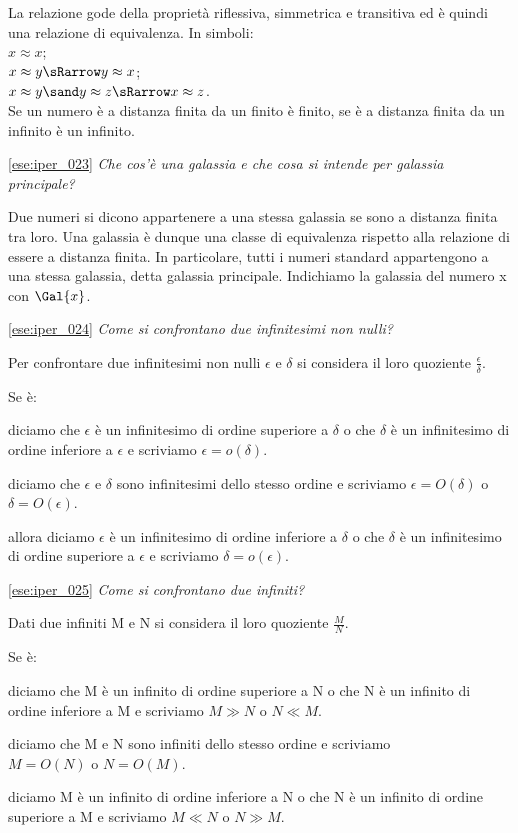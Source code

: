La relazione gode della proprietà riflessiva, simmetrica e transitiva ed è 
quindi una relazione di equivalenza. In simboli:\\
\(x \approx x\);\\
\(x \approx y \sRarrow y \approx x\);\\
\(x \approx y \sand y \approx z \sRarrow x \approx z\).\\
Se un numero è a distanza finita da un finito è finito, se è a distanza finita 
da un infinito è un infinito.

\ref{ese:iper_023} 
\emph{Che cos'è una galassia e che cosa si intende per galassia principale?}

Due numeri si dicono appartenere a una stessa galassia se sono a distanza 
finita tra loro. Una galassia è dunque una classe di equivalenza rispetto alla 
relazione di essere a distanza finita. In particolare, tutti i numeri standard 
appartengono a una stessa galassia, detta galassia principale. Indichiamo la 
galassia del numero x con \(\Gal{x}\).

\ref{ese:iper_024} 
\emph{Come si confrontano due infinitesimi non nulli?}

Per confrontare due infinitesimi non nulli \(\epsilon\) e \(\delta\) si 
considera il loro quoziente \(\frac{\epsilon}{\delta}\). 

Se è:
\begin{description} [nosep]
 \item [infinitesimo] 
diciamo che \(\epsilon\) è un infinitesimo di ordine superiore a \(\delta\) o 
che \(\delta\) è un infinitesimo di ordine inferiore a 
\(\epsilon\) e 
scriviamo \(\epsilon = o(\delta)\).
 \item [finito non infinitesimo] 
diciamo che \(\epsilon\) e \(\delta\) sono infinitesimi dello stesso ordine e 
scriviamo \(\epsilon = O(\delta)\) o \(\delta = O(\epsilon)\).
 \item [infinito]
 allora diciamo \(\epsilon\) è un infinitesimo di ordine inferiore a \(\delta\) 
o che \(\delta\) è un infinitesimo di ordine superiore a \(\epsilon\) e 
scriviamo \(\delta = o(\epsilon)\).
\end{description}

\ref{ese:iper_025} 
\emph{Come si confrontano due infiniti?}

Dati due infiniti M e N si considera il loro quoziente \(\frac{M}{N}\). 

Se è:
\begin{description} [nosep]
 \item [infinito] 
diciamo che M è un infinito di ordine superiore a N o che N è un infinito di 
ordine inferiore a M e scriviamo \(M \gg N\) o \(N \ll M\).
 \item [finito non infinitesimo] 
diciamo che M e N sono infiniti dello stesso ordine e scriviamo \\
\(M = O(N)\) o \(N = O(M)\).
 \item [infinitesimo]
diciamo M è un infinito di ordine inferiore a N o che N è un 
infinito di ordine superiore a M e scriviamo \(M \ll N\) o \(N \gg M\).
\end{description}

